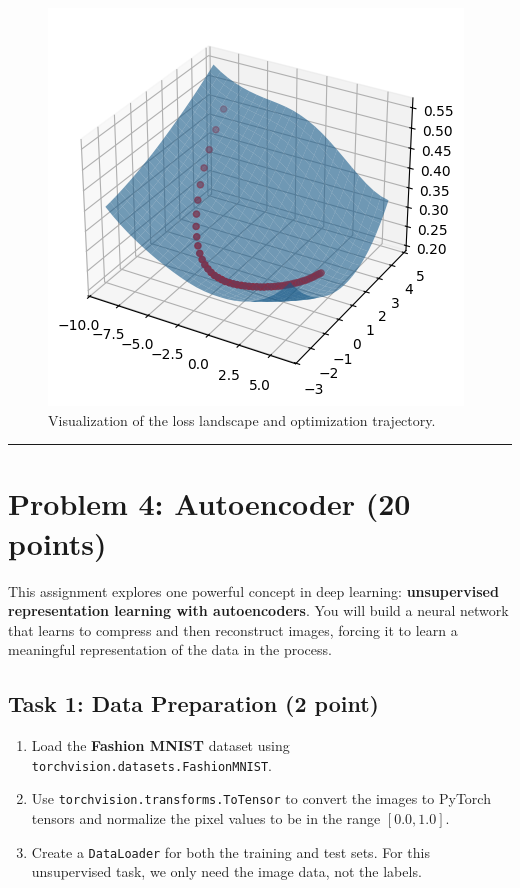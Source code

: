 \documentclass[
  letterpaper,
  DIV=11,
  numbers=noendperiod]{scrartcl}
\providecommand{\tightlist}{%
  \setlength{\itemsep}{0pt}\setlength{\parskip}{0pt}}\usepackage{longtable,booktabs,array}
\begin{document}
\begin{figure}[H]

{\centering \includegraphics{CS541_HW3_git_files/figure-latex/cs541_hw3_p2-3_d1a-prob3-output-1.png}

}

\caption{Visualization of the loss landscape and optimization
trajectory.}

\end{figure}%

\begin{center}\rule{0.5\linewidth}{0.5pt}\end{center}

\section{Problem 4: Autoencoder (20
points)}\label{problem-4-autoencoder-20-points}

This assignment explores one powerful concept in deep learning:
\textbf{unsupervised representation learning with autoencoders}. You
will build a neural network that learns to compress and then reconstruct
images, forcing it to learn a meaningful representation of the data in
the process.

\subsection{Task 1: Data Preparation (2
point)}\label{task-1-data-preparation-2-point}

\begin{enumerate}
\def\labelenumi{\arabic{enumi}.}
\tightlist
\item
  Load the \textbf{Fashion MNIST} dataset using
  \texttt{torchvision.datasets.FashionMNIST}.
\item
  Use \texttt{torchvision.transforms.ToTensor} to convert the images to
  PyTorch tensors and normalize the pixel values to be in the range
  \([0.0, 1.0]\).
\item
  Create a \texttt{DataLoader} for both the training and test sets. For
  this unsupervised task, we only need the image data, not the labels.
\end{enumerate}
\end{document}

